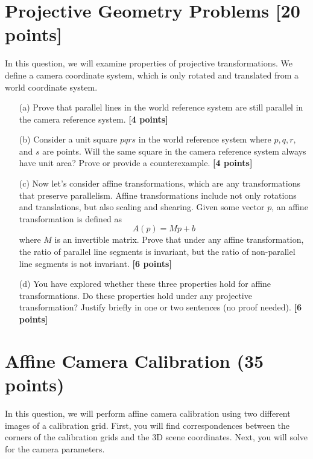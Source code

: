 




\section{Projective Geometry Problems [20 points]}
In this question, we will examine properties of projective transformations. We define a camera coordinate system, which is only rotated and translated from a world coordinate system.
\begin{itemize}
    \item[(a)]Prove that parallel lines in the world reference system are still parallel in the camera reference system. {\bf [4 points]}

    \item[(b)]Consider a unit square $pqrs$ in the world reference system where $p, q, r, $ and $s$ are points. Will the same square in the camera reference system always have unit area? Prove or provide a counterexample. {\bf [4 points]}

    \item[(c)]Now let's consider affine transformations, which are any transformations that preserve parallelism. Affine transformations include not only rotations and translations, but also scaling and shearing. Given some vector $p$, an affine transformation is defined as \[A(p) = Mp + b\] where $M$ is an invertible matrix. Prove that under any affine transformation, the ratio of parallel line segments is invariant, but the ratio of non-parallel line segments is not invariant. {\bf [6 points]}

    \item[(d)]You have explored whether these three properties hold for affine transformations. Do these properties hold under any projective transformation? Justify briefly in one or two sentences (no proof needed). {\bf [6 points]}
\end{itemize}


\section{Affine Camera Calibration (35 points)}

In this question, we will perform affine camera calibration using two different images of a calibration grid.  First, you will find correspondences between the corners of the calibration grids and the 3D scene coordinates.  Next, you will solve for the camera parameters.

